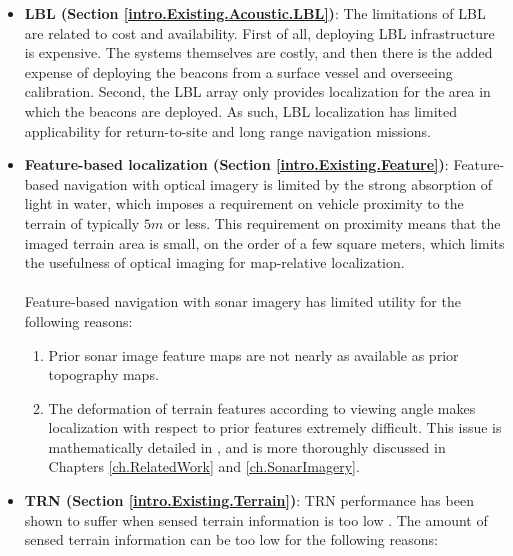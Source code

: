 \begin{itemize}
\item \textbf{LBL (Section \ref{intro.Existing.Acoustic.LBL})}: The limitations of LBL are related to cost and availability.  First of all, deploying LBL infrastructure is expensive.  The systems themselves are costly, and then there is the added expense of deploying the beacons from a surface vessel and overseeing calibration.  Second, the LBL array only provides localization for the area in which the beacons are deployed. As such, LBL localization has limited applicability for return-to-site and long range navigation missions.

\item \textbf{Feature-based localization (Section \ref{intro.Existing.Feature})}: Feature-based navigation with optical imagery is limited by the strong absorption of light in water, which imposes a requirement on vehicle proximity to the terrain of typically $5m$ or less.  
This requirement on proximity means that the imaged terrain area is small, on the order of a few square meters, which limits the usefulness of optical imaging for map-relative localization.
\\ \\
Feature-based navigation with sonar imagery has limited utility for the following reasons:

\begin{enumerate}
\item Prior sonar image feature maps are not nearly as available as prior topography maps.
\item The deformation of terrain features according to viewing angle makes localization with respect to prior features extremely difficult.  
This issue is mathematically detailed in \cite{Rikoski2005}, and is more thoroughly discussed in Chapters \ref{ch.RelatedWork} and \ref{ch.SonarImagery}.
\end{enumerate}

\item \textbf{TRN (Section \ref{intro.Existing.Terrain})}: TRN performance has been shown to suffer when sensed terrain information is too low \cite{Dektor2012}.  
The amount of sensed terrain information can be too low for the following reasons:


\end{itemize}
